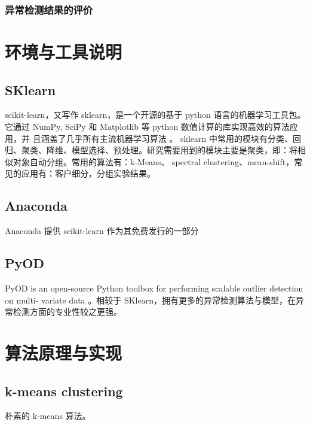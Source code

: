 \documentclass[UTF8]{ctexart}
\begin{document}



        \subsubsection{异常检测结果的评价}

\section{环境与工具说明}
    \subsection{SKlearn}
        scikit-learn，又写作 sklearn，是一个开源的基于 python 语言的机器学习工具包。
        它通过 NumPy, SciPy 和 Matplotlib 等 python 数值计算的库实现高效的算法应用，并
        且涵盖了几乎所有主流机器学习算法 \cite{link2}。 sklearn 中常用的模块有分类、回归、聚类、降维、模型选择、预处理。研究需要用到的模块主要是聚类，即：将相似对象自动分组。常用的算法有：k-Means、 spectral clustering、mean-shift，常见的应用有：客户细分，分组实验结果。
    \subsection{Anaconda}
        Anaconda 提供 scikit-learn 作为其免费发行的一部分
    \subsection{PyOD}
        PyOD is an open-source Python toolbox for performing scalable outlier detection on multi-
        variate data \cite{zhao2019pyod}。相较于 SKlearn，拥有更多的异常检测算法与模型，在异常检测方面的专业性较之更强。

\section{算法原理与实现}
    \subsection{k-means clustering}
        朴素的 k-means 算法。\cite{link3}
\end{document}
